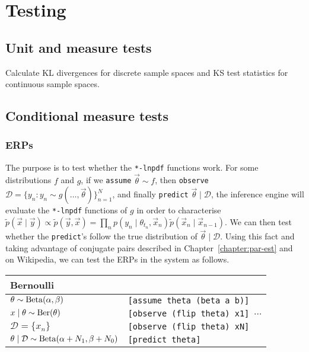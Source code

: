\section{Testing}
\subsection{Unit and measure tests}
Calculate KL divergences for discrete sample spaces and KS test statistics for continuous sample spaces.
\subsection{Conditional measure tests}
\subsubsection{ERPs}
The purpose is to test whether the \verb!*-lnpdf! functions work. For some distributions $f$ and $g$, if we \verb!assume! $\vec\theta \sim f$, then \verb!observe! $\mathcal D = \{y_n : y_n \sim g(\dotsc, \vec \theta)\}_{n = 1}^N$, and finally \verb!predict! $\vec\theta \mid \mathcal D$, the inference engine will evaluate the \verb!*-lnpdf! functions of $g$ in order to characterise $\tilde p(\vec x \mid \vec y) \propto \tilde p(\vec y, \vec x) = \prod_n p(y_n \mid \theta_{t_n}, \vec x_n) \tilde p(\vec x_n \mid \vec x_{n - 1})$. We can then test whether the \verb!predict!'s follow the true distribution of $\vec\theta \mid \mathcal D$. Using this fact and taking advantage of conjugate pairs described in Chapter~\ref{chapter:par-est} and on Wikipedia, we can test the ERPs in the system as follows.

\begin{table}[h]
\begin{tabular}{ll}
\toprule
Bernoulli & \\
\midrule
$\theta \sim \operatorname{Beta}(\alpha, \beta)$								& \texttt{[assume theta (beta a b)]} \\
$x \mid \theta \sim \operatorname{Ber}(\theta)$								& \texttt{[observe (flip theta) x1] $\cdots$} \\
$\mathcal D = \{x_n\}$											& \texttt{[observe (flip theta) xN]} \\
$\theta \mid \mathcal D \sim \operatorname{Beta}(\alpha + N_1, \beta + N_0)$	& \texttt{[predict theta]} \\
\bottomrule
\end{tabular}
\end{table}

